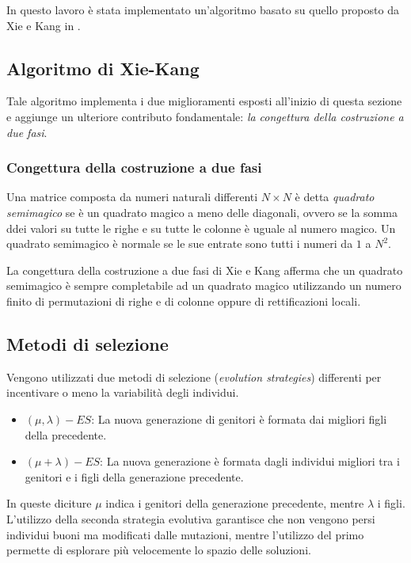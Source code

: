 \documentclass[italian,twoside,twocolumn]{article}
\begin{document}
In questo lavoro è stata implementato un'algoritmo basato su quello proposto da  Xie e Kang in \cite{XieKang:2003}.

\subsection{Algoritmo di Xie-Kang}

Tale algoritmo implementa i due miglioramenti esposti all'inizio di questa sezione e aggiunge un ulteriore contributo fondamentale: \emph{la congettura della costruzione a due fasi}.

\subsubsection{Congettura della costruzione a due fasi}
Una matrice composta da numeri naturali differenti $ N\times N $ è detta \emph{quadrato semimagico} se è un quadrato magico a meno delle diagonali, ovvero se la somma ddei valori su tutte le righe e su tutte le colonne è uguale al numero magico. Un quadrato semimagico è normale se le sue entrate sono tutti i numeri da $ 1 $ a $ N^2 $. 

La congettura della costruzione a due fasi di Xie e Kang afferma che un quadrato semimagico è sempre completabile ad un quadrato magico utilizzando un numero finito di permutazioni di righe e di colonne oppure di rettificazioni locali. 

\subsection{Metodi di selezione}
Vengono utilizzati due metodi di selezione (\emph{evolution strategies}) differenti per incentivare o meno la variabilità degli individui. 
\begin{itemize}
	\item$ (\mu, \lambda)-ES $: La nuova generazione di genitori è formata dai migliori figli della precedente.
	\item $ (\mu + \lambda)-ES $: La nuova generazione è formata dagli individui migliori tra i genitori e i figli della generazione precedente.
\end{itemize}
In queste diciture $ \mu $ indica i genitori della generazione precedente, mentre $ \lambda $ i figli. 
L'utilizzo della seconda strategia evolutiva garantisce che non vengono persi individui buoni ma modificati dalle mutazioni, mentre l'utilizzo del primo permette di esplorare più velocemente lo spazio delle soluzioni. 
\end{document}
